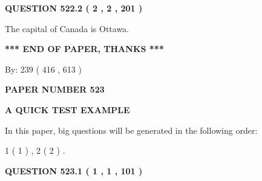 \documentclass[12pt]{article}
\begin{document}
 
  
\vspace{0.2in}
  
{\textbf{\Large{QUESTION
522.2 
 ( 2 , 2 , 201 )
}}}
  
  
 
 
\noindent{}
 
 
The capital of Canada is Ottawa.
 
 
 
 
   
   
 \vspace{0.2in}
 
   
   
   
   
\vspace{1.0in} 
{\textbf{\large{ *** END OF PAPER, THANKS *** }}} 
   
   
\hspace{1.0in} By: 
 239 ( 416 ,  613 )
   
   
   
   
\newpage 
\setcounter{page}{ 
   523001 } 
   
   
   
   
 {\textbf{ \Large{ PAPER NUMBER  523  }}}
   
   
\vspace{0.2in}
   
   
   
   
   
   
 \vspace{0.2in}
{\LARGE {\textbf{ A QUICK TEST EXAMPLE}}}
   
   
   
\vspace{0.2in}
   
In this paper, big questions will be generated in the following order: 
   
   
   1 ( 1 )
 ,
   2 ( 2 )
 .
  
\vspace{0.2in}
  
{\textbf{\Large{QUESTION
523.1 
 ( 1 , 1 , 101 )
}}}
  
  
 
 
\noindent{}
\end{document}
